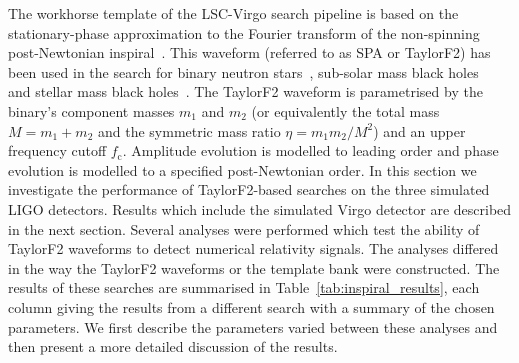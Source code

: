 \newcommand\T{\rule{0pt}{2.6ex}}
\newcommand\B{\rule[-1.2ex]{0pt}{0pt}}
\newcommand\TT{\rule{0pt}{4.2ex}}
\newcommand\BB{\rule[-2.4ex]{0pt}{0pt}}
\newcommand\TTT{\rule{0pt}{3.8ex}}


The workhorse template of the LSC-Virgo search pipeline is based on the
stationary-phase approximation to the Fourier transform of the
non-spinning post-Newtonian inspiral~\cite{Droz:1999qx,Allen:2005fk}.
This waveform (referred to as SPA or TaylorF2) has been used in the
search for binary neutron
stars~\cite{Abbott:2003pj,Abbott:2005pe,Abbott:2007xi,Abbott:2009tt}, 
sub-solar mass black holes~\cite{Abbott:2005pf,Abbott:2007xi,Abbott:2009tt}
and stellar mass black holes~\cite{Abbott:2009tt}. The TaylorF2 waveform
is parametrised by the binary's component masses $m_1$ and $m_2$ (or
equivalently the total mass $M = m_1 + m_2$ and the symmetric mass ratio
$\eta = m_1 m_2 / M^2$) and an upper frequency cutoff $f_\mathrm{c}$.
Amplitude evolution is modelled to leading order and phase evolution is
modelled to a specified post-Newtonian order. In this section we investigate
the performance of TaylorF2-based searches on the three simulated LIGO
detectors. Results which include the simulated Virgo detector are described in
the next section.  Several analyses were performed 
which test the ability of TaylorF2 waveforms to detect numerical relativity
signals. The analyses differed in the way the TaylorF2 waveforms or the
template bank were constructed.  The results of these searches are summarised
in Table~\ref{tab:inspiral_results}, each column giving the results from a
different search with a summary of the chosen parameters.  We first describe
the parameters varied between these analyses and then present a more detailed
discussion of the results.

